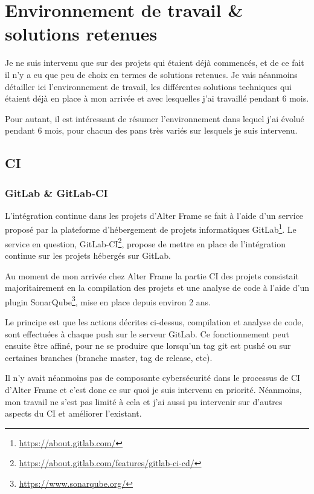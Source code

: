 \section{Environnement de travail \& solutions retenues}
Je ne suis intervenu que sur des projets qui étaient déjà commencés, et de ce fait il n'y a eu que peu de choix en termes de solutions retenues. Je vais néanmoins détailler ici l'environnement de travail, les différentes solutions techniques qui étaient déjà en place à mon arrivée et avec lesquelles j'ai travaillé pendant 6 mois. 

Pour autant, il est intéressant de résumer l'environnement dans lequel j'ai évolué pendant 6 mois, pour chacun des pans très variés sur lesquels je suis intervenu.

\subsection{CI}
\subsubsection{GitLab \& GitLab-CI}
L'intégration continue dans les projets d'Alter Frame se fait à l'aide d'un service proposé par la plateforme d'hébergement de projets informatiques GitLab\footnote{\url{https://about.gitlab.com/}}. Le service en question, GitLab-CI\footnote{\url{https://about.gitlab.com/features/gitlab-ci-cd/}}, propose de mettre en place de l'intégration continue sur les projets hébergés sur GitLab.

Au moment de mon arrivée chez Alter Frame la partie CI des projets consistait majoritairement en la compilation des projets et une analyse de code à l'aide d'un plugin SonarQube\footnote{\url{https://www.sonarqube.org/}}, mise en place depuis environ 2 ans.

Le principe est que les actions décrites ci-dessus, compilation et analyse de code, sont effectuées à chaque push sur le serveur GitLab. Ce fonctionnement peut ensuite être affiné, pour ne se produire que lorsqu'un tag git est pushé ou sur certaines branches (branche master, tag de release, etc).

Il n'y avait néanmoins pas de composante cybersécurité dans le processus de CI d'Alter Frame et c'est donc ce sur quoi je suis intervenu en priorité. Néanmoins, mon travail ne s'est pas limité à cela et j'ai aussi pu intervenir sur d'autres aspects du CI et améliorer l'existant.


